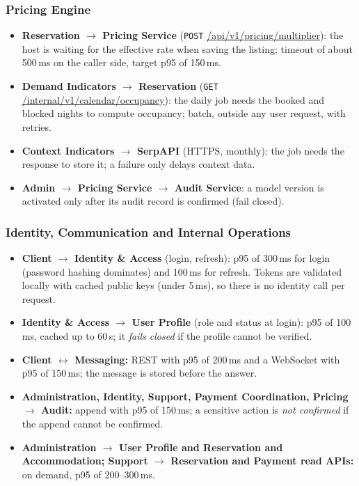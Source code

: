 \begingroup
\setlength{\emergencystretch}{3em}
\subsubsection{Pricing Engine}
\label{sec:price-sync}

\begin{itemize}
  \item \textbf{Reservation $\rightarrow$ Pricing Service}
    (\texttt{POST} \url{/api/v1/pricing/multiplier}): the host is waiting
    for the effective rate when saving the listing; timeout of about
    500\,ms on the caller side, target p95 of 150\,ms.
  \item \textbf{Demand Indicators $\rightarrow$ Reservation}
    (\texttt{GET} \url{/internal/v1/calendar/occupancy}): the daily job needs
    the booked and blocked nights to compute occupancy; batch, outside any
    user request, with retries.
  \item \textbf{Context Indicators $\rightarrow$ SerpAPI} (HTTPS, monthly):
    the job needs the response to store it; a failure only delays context
    data.
  \item \textbf{Admin $\rightarrow$ Pricing Service $\rightarrow$ Audit
    Service}: a model version is activated only after its audit record is
    confirmed (fail closed).
\end{itemize}
\endgroup

\begingroup
\setlength{\emergencystretch}{3em}
\subsubsection{Identity, Communication and Internal Operations}
\label{sec:id-sync}

\begin{itemize}
  \item \textbf{Client $\rightarrow$ Identity \& Access} (login, refresh):
    p95 of 300\,ms for login (password hashing dominates) and 100\,ms for
    refresh. Tokens are validated locally with cached public keys (under
    5\,ms), so there is no identity call per request.
  \item \textbf{Identity \& Access $\rightarrow$ User Profile} (role and
    status at login): p95 of 100\,ms, cached up to 60\,s; it \emph{fails
    closed} if the profile cannot be verified.
  \item \textbf{Client $\leftrightarrow$ Messaging:} REST with p95 of 200\,ms
    and a WebSocket with p95 of 150\,ms; the message is stored before the
    answer.
  \item \textbf{Administration, Identity, Support, Payment Coordination,
    Pricing $\rightarrow$ Audit:} append with p95 of 150\,ms; a sensitive
    action is \emph{not confirmed} if the append cannot be confirmed.
  \item \textbf{Administration $\rightarrow$ User Profile and Reservation and
    Accommodation; Support $\rightarrow$ Reservation and Payment read APIs:}
    on demand, p95 of 200--300\,ms.
\end{itemize}


